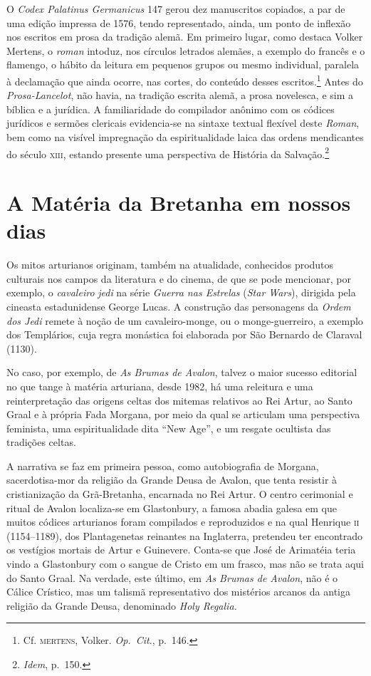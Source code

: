 O \textit{Codex Palatinus Germanicus} 147 gerou dez manuscritos
copiados, a par de uma edição impressa de 1576, tendo representado,
ainda, um ponto de inflexão nos escritos em prosa da tradição alemã. Em
primeiro lugar, como destaca Volker Mertens, o \textit{roman} intoduz,
nos círculos letrados alemães, a exemplo do francês e o flamengo, o
hábito da leitura em pequenos grupos ou mesmo individual, paralela à
declamação que ainda ocorre, nas cortes, do conteúdo desses
escritos.\footnote{ Cf. \textsc{mertens}, Volker. \textit{Op.~Cit}., p.~146.}
Antes do \textit{Prosa-Lancelot}, não havia, na tradição escrita alemã,
a prosa novelesca, e sim a bíblica e a jurídica. A familiaridade do
compilador anônimo com os códices jurídicos e sermões clericais
evidencia-se na sintaxe textual flexível deste \textit{Roman}, bem como
na visível impregnação da espiritualidade laica das ordens mendicantes
do século \textsc{xiii}, estando presente uma perspectiva de História da
Salvação.\footnote{ \textit{Idem}, p.~150.}

\section{A Matéria da Bretanha em nossos dias}

Os mitos arturianos originam, também na atualidade, conhecidos produtos
culturais nos campos da literatura e do cinema, de que se pode
mencionar, por exemplo, o \textit{cavaleiro} \textit{jedi} na série
\textit{Guerra nas Estrelas} (\textit{Star Wars}), dirigida pela
cineasta estadunidense George Lucas. A construção das personagens da
\textit{Ordem dos Jedi} remete à noção de um cavaleiro-monge, ou o
monge-guerreiro, a exemplo dos Templários, cuja regra monástica foi
elaborada por São Bernardo de Claraval (1130). 

No caso, por exemplo, de \textit{As Brumas de Avalon}, talvez o maior
sucesso editorial no que tange à matéria arturiana, desde 1982, há uma
releitura e uma reinterpretação das origens celtas dos mitemas
relativos ao Rei Artur, ao Santo Graal e à própria Fada Morgana, por
meio da qual se articulam uma perspectiva feminista, uma
espiritualidade dita “New Age”, e um resgate ocultista das tradições
celtas. 

A narrativa se faz em primeira pessoa, como autobiografia de Morgana,
sacerdotisa-mor da religião da Grande Deusa de Avalon, que tenta
resistir à cristianização da Grã-Bretanha, encarnada no Rei Artur. O
centro cerimonial e ritual de Avalon localiza-se em Glastonbury, a
famosa abadia galesa em que muitos códices arturianos foram compilados
e reproduzidos e na qual Henrique \textsc{ii} (1154--1189), dos Plantagenetas
reinantes na Inglaterra, pretendeu ter encontrado os vestígios mortais
de Artur e Guinevere. Conta-se que José de Arimatéia teria vindo a
Glastonbury com o sangue de Cristo em um frasco, mas não se trata aqui
do Santo Graal. Na verdade, este último, em \textit{As Brumas de
Avalon}, não é o Cálice Crístico, mas um talismã representativo dos
mistérios arcanos da antiga religião da Grande Deusa, denominado
\textit{Holy Regalia.}

